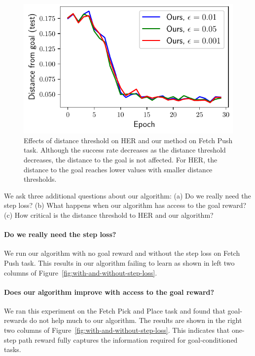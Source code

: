 \begin{figure}
  \includegraphics[width=\frac\columnwidth]{media/res/ablate-ddpg-dqst-low_tresh_chosen-low_thresh_alt-dqst/0.001-FetchPushPR-be467dfepoch-test/ag_g_dist.pdf}%
  \caption{Effects of distance threshold on HER and our method on Fetch Push
task. Although the success rate decreases as the distance threshold decreases,
the distance to the goal is not affected. For HER, the distance to the goal
reaches lower values with smaller distance thresholds.}%
  \label{fig:with-different-distance-thresholds}%
\end{figure}%
% 

We ask three additional questions about our algorithm:
(a) Do we really need the step loss?
(b) What happens when our algorithm has access to the goal reward?
(c) How critical is the distance threshold to HER and our algorithm?
\paragraph{Do we really need the step loss?}
%
We run our algorithm with no goal reward and without the step loss on Fetch Push
task. This results in our algorithm failing to learn as shown in left two
columns of Figure~\ref{fig:with-and-without-step-loss}.

\paragraph{Does our algorithm improve with access to the goal reward?}

We ran this experiment on the Fetch Pick and Place task and found that goal-rewards
do not help much to our algorithm. The results are shown in the right two columns
of Figure~\ref{fig:with-and-without-step-loss}. This indicates that one-step path reward
fully captures the information required for goal-conditioned tasks.

